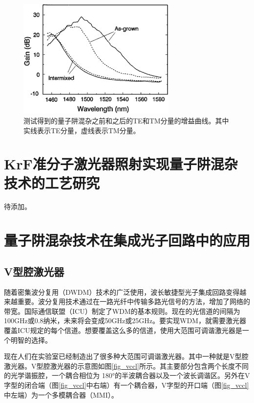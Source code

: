 \documentclass[oneside]{ZJUthesis}
\begin{document}
\begin{figure}[!t]
    \centering
    \includegraphics[width=0.7\textwidth]{./Pictures/amplifier.eps}
    \caption{测试得到的量子阱混杂之前和之后的TE和TM分量的增益曲线。其中实线表示TE分量，虚线表示TM分量。}
    \label{fig_amplifier}
\end{figure}

\chapter{KrF准分子激光器照射实现量子阱混杂技术的工艺研究}

待添加。

\chapter{量子阱混杂技术在集成光子回路中的应用}

\section{V型腔激光器}

随着密集波分复用（DWDM）技术的广泛使用，波长敏捷型光子集成回路变得越来越重要。波分复用技术通过在一路光纤中传输多路光信号的方法，增加了网络的带宽。国际通信联盟（ICU）制定了WDM的基本规则。现在的光信道的间隔为100GHz或0.8纳米，未来将会变成50GHz或25GHz。要实现WDM，就需要激光器覆盖ICU规定的每个信道。想要覆盖这么多的信道，使用大范围可调谐激光器是一个明智的选择。

现在人们在实验室已经制造出了很多种大范围可调谐激光器。其中一种就是V型腔激光器。V型腔激光器的示意图如图\ref{fig_vccl}所示。其主要部分包含两个长度不同的光学谐振腔，一个耦合相位为 180°的半波耦合器以及一个波长调谐区。另外在V字型的闭合端（图\ref{fig_vccl}中右端）有一个耦合器，V字型的开口端（图\ref{fig_vccl} 中左端）为一个多模耦合器（MMI）。
\end{document}
